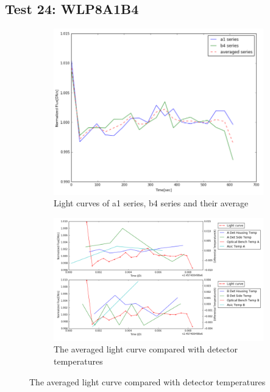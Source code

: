 \documentclass[conference]{IEEEtran}
\begin{document}
\subsection{Test 24: WLP8A1B4} 
\begin{figure}[H]
    \centering
    \begin{subfigure}{1}
        \includegraphics[scale=0.4]{ts_test24}
        \caption{Light curves of a1 series, b4 series and their average}
    \end{subfigure}

    \begin{subfigure}{2}
        \includegraphics[scale=0.4]{temp_test24}
        \caption{The averaged light curve compared with detector temperatures}
    \end{subfigure}
   

\end{figure}
\end{document}
